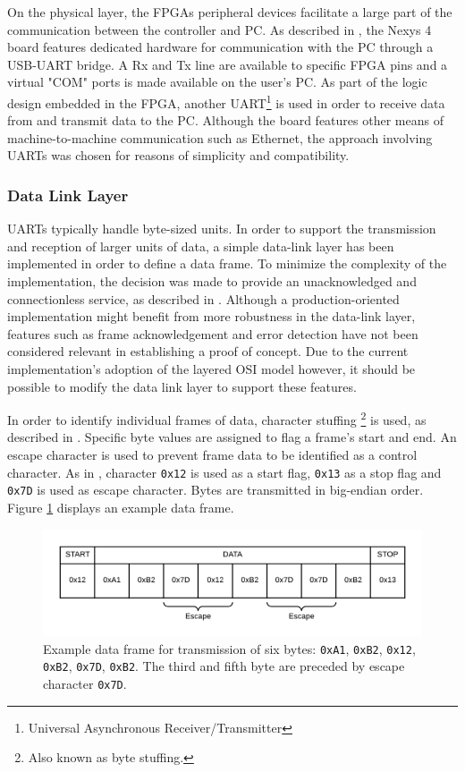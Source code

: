 \documentclass[main.tex]{subfiles}
\begin{document}
On the physical layer, the FPGAs peripheral devices facilitate a large part of the communication between the controller and PC. As described in \cite[p.9]{nexys4reference}, the Nexys 4 board features dedicated hardware for communication with the PC through a USB-UART bridge. A Rx and Tx line are available to specific FPGA pins and a virtual "COM" ports is made available on the user's PC. As part of the logic design embedded in the FPGA, another UART\footnote{Universal Asynchronous Receiver/Transmitter} is used in order to receive data from and transmit data to the PC. Although the board features other means of machine-to-machine communication such as Ethernet, the approach involving UARTs was chosen for reasons of simplicity and compatibility.

\subsubsection{Data Link Layer}
UARTs typically handle byte-sized units. In order to support the transmission and reception of larger units of data, a simple data-link layer has been implemented in order to define a data frame. To minimize the complexity of the implementation, the decision was made to provide an unacknowledged and  connectionless service, as described in \cite[p.177]{tanenbaumcomputer}. Although a production-oriented implementation might benefit from more robustness in the data-link layer, features such as frame acknowledgement and error detection have not been considered relevant in establishing a proof of concept. Due to the current implementation's adoption of the layered OSI model however, it should be possible to modify the data link layer to support these features. 

In order to identify individual frames of data, character stuffing \footnote{Also known as byte stuffing.} is used, as described in \cite[p.180]{tanenbaumcomputer}. Specific byte values are assigned to flag a frame's start and end. An escape character is used to prevent frame data to be identified as a control character. As in \cite{Frami37}, character \texttt{0x12} is used as a start flag, \texttt{0x13} as a stop flag and \texttt{0x7D} is used as escape character. Bytes are transmitted in big-endian order. Figure \ref{fig:character-stuffing} displays an example data frame.

\begin{figure}[h]
\centering
\caption{Example data frame for transmission of six bytes: \texttt{0xA1}, \texttt{0xB2}, \texttt{0x12}, \texttt{0xB2}, \texttt{0x7D}, \texttt{0xB2}. The third and fifth byte are preceded by escape character \texttt{0x7D}.}
\label{fig:character-stuffing}
\includegraphics[width=.8\textwidth]{img/character-stuffing}
\end{figure}
\end{document}
